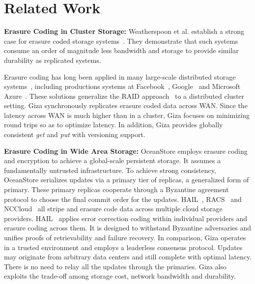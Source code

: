 \section{Related Work}


{\bf Erasure Coding in Cluster Storage:}
Weatherspoon et al. establish a strong case for erasure coded storage systems~\cite{weatherspoon2002erasure}. They demonstrate that such systems consume an order of magnitude less bandwidth and storage to provide similar durability as replicated systems.

Erasure coding has long been applied in many large-scale distributed storage systems~\cite{bib:saito2004fab, bib:zhang2004repstore, haeberlen2005glacier, bib:abd2005ursa, welch2008scalable, sathiamoorthy2013xoring, zhang2016efficient}, including productions systems at Facebook~\cite{borthakur2010hdfs}, Google~\cite{fikes2010storage, ford2010availability} and Microsoft Azure~\cite{huang2012erasure}. These solutions generalize the RAID approach~\cite{patterson1988case, wilkes1996hp} to a distributed cluster setting. Giza synchronously replicates erasure coded data across WAN. Since the latency across WAN is much higher than in a cluster, Giza focuses on minimizing round trips so as to optimize latency. In addition, Giza provides globally consistent {\em get} and {\em put} with versioning support.

{\bf Erasure Coding in Wide Area Storage:}
OceanStore \cite{OceanStore, bib:pond} employs erasure coding and encryption to achieve a global-scale persistent storage. It assumes a fundamentally untrusted infrastructure. To achieve strong consistency, OceanStore serializes updates via a primary tier of replicas, a generalized form of primary. These primary replicas cooperate through a Byzantine agreement protocol to choose the final commit order for the updates. 
HAIL~\cite{Bowers:2009:HHI:1653662.1653686}, RACS~\cite{Abu-Libdeh:2010:RCC:1807128.1807165} and NCCloud~\cite{hu2012nccloud} all stripe and erasure code data across multiple cloud storage providers. 
HAIL~\cite{Bowers:2009:HHI:1653662.1653686} applies error correction coding within individual providers and erasure coding across them. It is designed to withstand Byzantine adversaries and unifies proofs of retrievability and failure recovery. 
In comparison, Giza operates in a trusted environment and employs a leaderless consensus protocol. Updates may originate from arbitrary data centers and still complete with optimal latency. There is no need to relay all the updates through the primaries.  Giza also exploits the trade-off among storage cost, network bandwidth and durability.

